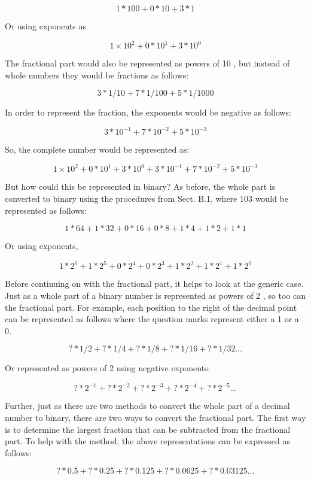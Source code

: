 \documentclass[10pt]{article}
\begin{document}
$$
1 * 100+0 * 10+3 * 1
$$

Or using exponents as

$$
1 \times 10^{2}+0 * 10^{1}+3 * 10^{0}
$$

The fractional part would also be represented as powers of 10 , but instead of whole numbers they would be fractions as follows:

$$
3 * 1 / 10+7 * 1 / 100+5 * 1 / 1000
$$

In order to represent the fraction, the exponents would be negative as follows:

$$
3 * 10^{-1}+7 * 10^{-2}+5 * 10^{-3}
$$

So, the complete number would be represented as:

$$
1 \times 10^{2}+0 * 10^{1}+3 * 10^{0}+3 * 10^{-1}+7 * 10^{-2}+5 * 10^{-3}
$$

But how could this be represented in binary? As before, the whole part is converted to binary using the procedures from Sect. B.1, where 103 would be represented as follows:

$$
1 * 64+1 * 32+0 * 16+0 * 8+1 * 4+1 * 2+1 * 1
$$

Or using exponents,

$$
1 * 2^{6}+1 * 2^{5}+0 * 2^{4}+0 * 2^{3}+1 * 2^{2}+1 * 2^{1}+1 * 2^{0}
$$

Before continuing on with the fractional part, it helps to look at the generic case. Just as a whole part of a binary number is represented as powers of 2 , so too can the fractional part. For example, each position to the right of the decimal point can be represented as follows where the question marks represent either a 1 or a 0.

$$
? * 1 / 2+? * 1 / 4+? * 1 / 8+? * 1 / 16+? * 1 / 32 \ldots
$$

Or represented as powers of 2 using negative exponents:

$$
? * 2^{-1}+? * 2^{-2}+? * 2^{-3}+? * 2^{-4}+? * 2^{-5} \ldots
$$

Further, just as there are two methods to convert the whole part of a decimal number to binary, there are two ways to convert the fractional part. The first way is to determine the largest fraction that can be subtracted from the fractional part. To help with the method, the above representations can be expressed as follows:

$$
? * 0.5+? * 0.25+? * 0.125+? * 0.0625+? * 0.03125 \ldots
$$
\end{document}
